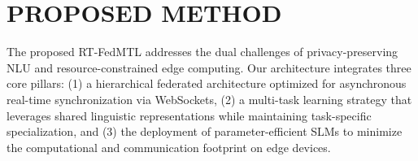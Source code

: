 

\section{PROPOSED METHOD}
\label{sec:proposed_method}

The proposed RT-FedMTL addresses the dual challenges of privacy-preserving NLU and resource-constrained edge computing. Our architecture integrates three core pillars: (1) a hierarchical federated architecture optimized for asynchronous real-time synchronization via WebSockets, (2) a multi-task learning strategy that leverages shared linguistic representations while maintaining task-specific specialization, and (3) the deployment of parameter-efficient SLMs to minimize the computational and communication footprint on edge devices.

